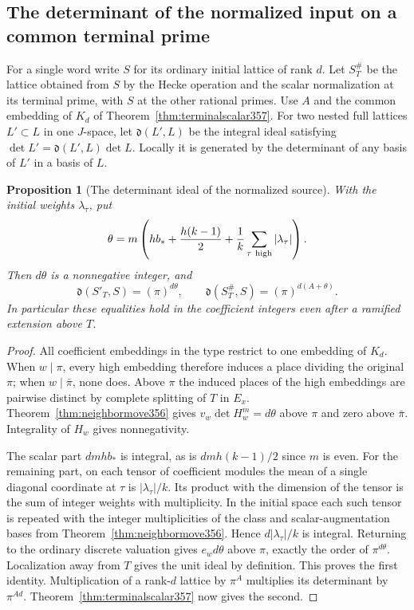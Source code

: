 \documentclass[a4paper,11pt]{article}
\newtheorem{proposition}{Proposition}[section]
\theoremstyle{definition}
\theoremstyle{remark}
\numberwithin{equation}{section}
\begin{document}
\subsection{The determinant of the normalized input on a common terminal prime}
\label{sec:normalizedimage357}

For a single word write \(S\) for its ordinary initial lattice
of rank \(d\). Let \(S^\#_T\) be the lattice obtained from
\(S\) by the Hecke operation and the scalar normalization at
its terminal prime, with \(S\) at the other rational primes.
Use \(A\) and the common embedding of \(K_d\) of
Theorem~\ref{thm:terminalscalar357}. For two nested full
lattices \(L'\subset L\) in one \(J\)-space, let
\(\mathfrak d(L',L)\) be the integral ideal satisfying
\(\det L'=\mathfrak d(L',L)\det L\). Locally it is generated
by the determinant of any basis of \(L'\) in a basis of \(L\).

\begin{proposition}[The determinant ideal of the normalized source]\leavevmode
\label{prop:terminalideal357}
With the initial weights \(\lambda_\tau\), put
\[
 \theta=m\left(hb_*+\frac{h(k-1)}2+
                       \frac{1}{k}\sum_{\tau\ {\rm high}}|\lambda_\tau|\right).
\]
Then \(d\theta\) is a nonnegative integer, and
\[
   \mathfrak d(S'_T,S)=(\pi)^{d\theta},\qquad
   \mathfrak d(S^\#_T,S)=(\pi)^{d(A+\theta)}.
\]
In particular these equalities hold in the coefficient integers
even after a ramified extension above \(T\).
\end{proposition}
\begin{proof}
All coefficient embeddings in the type restrict to one embedding
of \(K_d\). When \(w\mid\pi\), every high embedding therefore
induces a place dividing the original \(\pi\); when
\(w\mid\bar\pi\), none does. Above \(\pi\) the induced places of
the high embeddings are pairwise distinct by complete splitting
of \(T\) in \(E_x\). Theorem~\ref{thm:neighbormove356} gives
\(v_w\det H_w^m=d\theta\) above \(\pi\) and zero above
\(\bar\pi\). Integrality of \(H_w\) gives nonnegativity.

The scalar part \(dmhb_*\) is integral, as is
\(dmh(k-1)/2\) since \(m\) is even. For the remaining
part, on each tensor of coefficient modules the mean of a
single diagonal coordinate at \(\tau\) is
\(|\lambda_\tau|/k\). Its product with the dimension of the
tensor is the sum of integer weights with multiplicity.
In the initial space each such tensor is repeated with the
integer multiplicities of the class and scalar-augmentation
bases from Theorem~\ref{thm:neighbormove356}. Hence
\(d|\lambda_\tau|/k\) is integral. Returning to the ordinary
discrete valuation gives \(e_w d\theta\) above \(\pi\),
exactly the order of \(\pi^{d\theta}\). Localization away
from \(T\) gives the unit ideal by definition. This proves
the first identity. Multiplication of a rank-\(d\) lattice
by \(\pi^A\) multiplies its determinant by \(\pi^{Ad}\).
Theorem~\ref{thm:terminalscalar357} now gives the second.
\end{proof}
\end{document}
